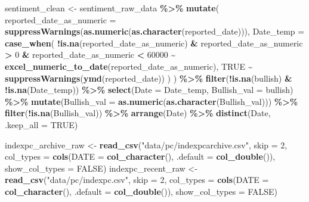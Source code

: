 \documentclass[
]{article}
\newenvironment{Shaded}{\begin{snugshade}}{\end{snugshade}}
\newcommand{\AttributeTok}[1]{\textcolor[rgb]{0.13,0.29,0.53}{#1}}
\newcommand{\ConstantTok}[1]{\textcolor[rgb]{0.56,0.35,0.01}{#1}}
\newcommand{\DecValTok}[1]{\textcolor[rgb]{0.00,0.00,0.81}{#1}}
\newcommand{\FunctionTok}[1]{\textcolor[rgb]{0.13,0.29,0.53}{\textbf{#1}}}
\newcommand{\NormalTok}[1]{#1}
\newcommand{\OtherTok}[1]{\textcolor[rgb]{0.56,0.35,0.01}{#1}}
\newcommand{\SpecialCharTok}[1]{\textcolor[rgb]{0.81,0.36,0.00}{\textbf{#1}}}
\newcommand{\StringTok}[1]{\textcolor[rgb]{0.31,0.60,0.02}{#1}}
\begin{document}
\begin{Shaded}
\begin{Highlighting}[]
\NormalTok{  sentiment\_clean }\OtherTok{\textless{}{-}}\NormalTok{ sentiment\_raw\_data }\SpecialCharTok{\%\textgreater{}\%}
    \FunctionTok{mutate}\NormalTok{(}
      \AttributeTok{reported\_date\_as\_numeric =} \FunctionTok{suppressWarnings}\NormalTok{(}\FunctionTok{as.numeric}\NormalTok{(}\FunctionTok{as.character}\NormalTok{(reported\_date))),}
      \AttributeTok{Date\_temp =} \FunctionTok{case\_when}\NormalTok{(}
        \SpecialCharTok{!}\FunctionTok{is.na}\NormalTok{(reported\_date\_as\_numeric) }\SpecialCharTok{\&}\NormalTok{ reported\_date\_as\_numeric }\SpecialCharTok{\textgreater{}} \DecValTok{0} \SpecialCharTok{\&}\NormalTok{ reported\_date\_as\_numeric }\SpecialCharTok{\textless{}} \DecValTok{60000} \SpecialCharTok{\textasciitilde{}} \FunctionTok{excel\_numeric\_to\_date}\NormalTok{(reported\_date\_as\_numeric),}
        \ConstantTok{TRUE} \SpecialCharTok{\textasciitilde{}} \FunctionTok{suppressWarnings}\NormalTok{(}\FunctionTok{ymd}\NormalTok{(reported\_date)) }
\NormalTok{      )}
\NormalTok{    ) }\SpecialCharTok{\%\textgreater{}\%}
    \FunctionTok{filter}\NormalTok{(}\SpecialCharTok{!}\FunctionTok{is.na}\NormalTok{(bullish) }\SpecialCharTok{\&} \SpecialCharTok{!}\FunctionTok{is.na}\NormalTok{(Date\_temp)) }\SpecialCharTok{\%\textgreater{}\%}  
    \FunctionTok{select}\NormalTok{(}\AttributeTok{Date =}\NormalTok{ Date\_temp, }\AttributeTok{Bullish\_val =}\NormalTok{ bullish) }\SpecialCharTok{\%\textgreater{}\%}
    \FunctionTok{mutate}\NormalTok{(}\AttributeTok{Bullish\_val =} \FunctionTok{as.numeric}\NormalTok{(}\FunctionTok{as.character}\NormalTok{(Bullish\_val))) }\SpecialCharTok{\%\textgreater{}\%}
    \FunctionTok{filter}\NormalTok{(}\SpecialCharTok{!}\FunctionTok{is.na}\NormalTok{(Bullish\_val)) }\SpecialCharTok{\%\textgreater{}\%}
    \FunctionTok{arrange}\NormalTok{(Date) }\SpecialCharTok{\%\textgreater{}\%}
    \FunctionTok{distinct}\NormalTok{(Date, }\AttributeTok{.keep\_all =} \ConstantTok{TRUE}\NormalTok{)}
  
\NormalTok{  indexpc\_archive\_raw }\OtherTok{\textless{}{-}} \FunctionTok{read\_csv}\NormalTok{(}\StringTok{"data/pc/indexpcarchive.csv"}\NormalTok{, }\AttributeTok{skip =} \DecValTok{2}\NormalTok{, }
                                  \AttributeTok{col\_types =} \FunctionTok{cols}\NormalTok{(}\AttributeTok{DATE =} \FunctionTok{col\_character}\NormalTok{(), }\AttributeTok{.default =} \FunctionTok{col\_double}\NormalTok{()),}
                                  \AttributeTok{show\_col\_types =} \ConstantTok{FALSE}\NormalTok{)}
\NormalTok{  indexpc\_recent\_raw }\OtherTok{\textless{}{-}} \FunctionTok{read\_csv}\NormalTok{(}\StringTok{"data/pc/indexpc.csv"}\NormalTok{, }\AttributeTok{skip =} \DecValTok{2}\NormalTok{, }
                                 \AttributeTok{col\_types =} \FunctionTok{cols}\NormalTok{(}\AttributeTok{DATE =} \FunctionTok{col\_character}\NormalTok{(), }\AttributeTok{.default =} \FunctionTok{col\_double}\NormalTok{()),}
                                 \AttributeTok{show\_col\_types =} \ConstantTok{FALSE}\NormalTok{)}
  

\end{Highlighting}
\end{Shaded}
\end{document}
